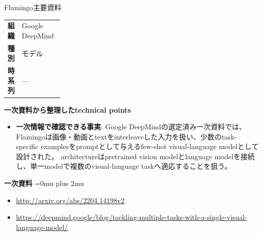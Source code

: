 \begin{technicalnote}{Flamingo}{主要資料}
\begingroup
\begin{tabularx}{\linewidth}{@{}>{\bfseries}p{0.22\linewidth}X@{}}
組織 & Google DeepMind \\
種別 & モデル \\
時系列 & — \\
\end{tabularx}
\smallskip
{\bfseries 一次資料から整理したtechnical points}
\begin{itemize}[leftmargin=1.5em,itemsep=0.35em]
\item \textbf{一次情報で確認できる事実}: Google DeepMindの選定済み一次資料では、Flamingoは画像・動画とtextをinterleaveした入力を扱い、少数のtask-specific examplesをpromptとして与えるfew-shot visual-language modelとして設計された。 architectureはpretrained vision modelとlanguage modelを接続し、単一modelで複数のvisual-language taskへ適応することを狙う。
\end{itemize}
\begin{minipage}{\linewidth}
\begin{samepage}
{\bfseries 一次資料}
\begingroup\sloppy
\Urlmuskip=0mu plus 2mu\relax
\begin{itemize}[leftmargin=1.5em,itemsep=0.25em]
\item {\scriptsize\url{http://arxiv.org/abs/2204.14198v2}}
\item {\scriptsize\url{https://deepmind.google/blog/tackling-multiple-tasks-with-a-single-visual-language-model/}}
\end{itemize}
\endgroup
\end{samepage}
\end{minipage}
\endgroup
\end{technicalnote}
\medskip

